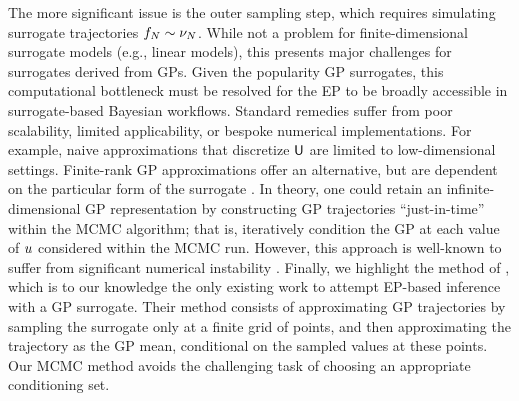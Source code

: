 \documentclass[12pt]{article}
\begin{document}
The more significant issue is the outer sampling step, which requires simulating surrogate 
trajectories $f_{N} \sim \nu_{N}$. While not a problem for finite-dimensional 
surrogate models (e.g., linear models), this presents major challenges for surrogates 
derived from GPs. Given the popularity GP surrogates, 
this computational bottleneck must be resolved for the EP to be broadly accessible in 
surrogate-based Bayesian workflows. Standard remedies suffer from poor scalability,
limited applicability, or bespoke numerical implementations. For example, naive 
approximations that discretize $\mathsf{U}$ are limited to low-dimensional settings.
Finite-rank GP approximations offer an alternative, but are dependent on the 
particular form of the surrogate \citep{pathwiseConditioning}. In theory, one 
could retain an infinite-dimensional GP representation by constructing 
GP trajectories ``just-in-time'' within the MCMC algorithm; that is, iteratively
condition the GP at each value of $u$ considered within the MCMC run.
However, this approach is well-known to suffer from significant numerical 
instability \citep{pathwiseConditioning}. Finally, we highlight the method of 
\citet{trainDynamics}, which is to our knowledge the only existing work to 
attempt EP-based inference with a GP surrogate. 
Their method consists of approximating GP 
trajectories by sampling the surrogate only at a finite grid of points, 
and then approximating the trajectory as the GP mean, conditional on the 
sampled values at these points. Our MCMC method avoids the challenging 
task of choosing an appropriate conditioning set.
\end{document}

